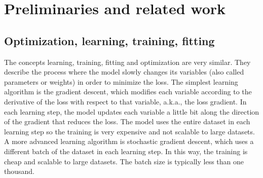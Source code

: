 \chapter{Preliminaries and related work}

\section{Optimization, learning, training, fitting}
The concepts learning, training, fitting and optimization are very similar. They describe the process where the model slowly changes its variables (also called parameters or weights) in order to minimize the loss. The simplest learning algorithm is the gradient descent, which modifies each variable according to the derivative of the loss with respect to that variable, a.k.a., the loss gradient.
In each learning step, the model updates each variable a little bit along the direction of the gradient that reduces the loss.
The model uses the entire dataset in each learning step so the training is very expensive and not scalable to large datasets.
A more advanced learning algorithm is stochastic gradient descent, which uses a different batch of the dataset in each learning step.
In this way, the training is cheap and scalable to large datasets.
The batch size is typically less than one thousand.

